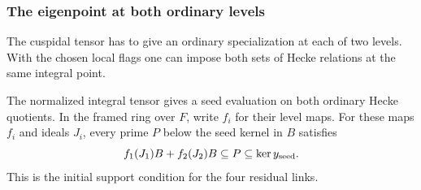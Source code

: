 \subsubsection{The eigenpoint at both ordinary levels}
\label{par:count-three-actual-seed}

The cuspidal tensor has to give an ordinary specialization at each of two levels. With the chosen local flags one can impose both sets of Hecke relations at the same integral point.

\begin{proposition}\label{prop:count-three-ordinary-attachment}
The normalized integral tensor gives a seed evaluation on both
ordinary Hecke quotients. In the framed ring over \(F\), write \(f_i\) for their level maps. For these maps \(f_i\) and ideals \(J_i\), every prime \(P\) below the seed kernel in \(B\) satisfies 
\[
 f_1(J_1)B+f_2(J_2)B\subseteq P\subseteq\ker y_{\rm seed}.
\]
 This is the initial support condition for the four
residual links.
\end{proposition}

